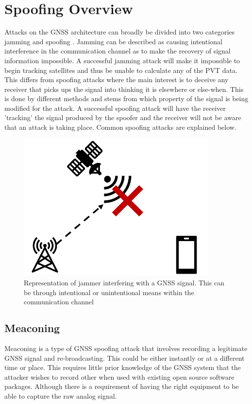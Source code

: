 \section{Spoofing Overview}
Attacks on the GNSS architecture can broadly be divided into two categories jamming and spoofing \cite{RN33} \cite{RN32}. Jamming can be described as causing intentional
interference in the communication channel as to make the recovery of signal information impossible. A successful jamming attack will make it impossible to begin tracking
satellites and thus be unable to calculate any of the PVT data. This differs from spoofing attacks where the main interest is to deceive any receiver that picks ups the
signal into thinking it is elsewhere or else-when. This is done by different methods and stems from which property of the signal is being modified for the attack. A
successful spoofing attack will have the receiver 'tracking' the signal produced by the spoofer and the receiver will not be aware that an attack is taking place. Common
spoofing attacks are explained below.

\begin{figure}[h]
    \begin{centering}
        \includegraphics[width=10cm, keepaspectratio]{Figures/Jamming.png}
        \caption{Representation of jammer interfering with a GNSS signal. This can be through intentional or unintentional means within the communication channel}
    \label{fig:jamming cartoon}
    \end{centering}
\end{figure}

\subsection{Meaconing}
Meaconing is a type of GNSS spoofing attack that involves recording a legitimate GNSS signal and re-broadcasting. This could be either instantly or at a different time or
place. This requires little prior knowledge of the GNSS system that the attacker wishes to record other when used with existing open source software packages. Although
there is a requirement of having the right equipment to be able to capture the raw analog signal.

